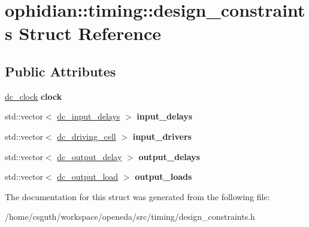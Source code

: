 \hypertarget{structophidian_1_1timing_1_1design__constraints}{\section{ophidian\-:\-:timing\-:\-:design\-\_\-constraints Struct Reference}
\label{structophidian_1_1timing_1_1design__constraints}
}
\subsection*{Public Attributes}
\begin{DoxyCompactItemize}
\item 
\hypertarget{structophidian_1_1timing_1_1design__constraints_a887bb719dde98d4635450445ca0cb7a3}{\hyperlink{structophidian_1_1timing_1_1dc__clock}{dc\-\_\-clock} {\bfseries clock}}\label{structophidian_1_1timing_1_1design__constraints_a887bb719dde98d4635450445ca0cb7a3}

\item 
\hypertarget{structophidian_1_1timing_1_1design__constraints_abdcd5469d71db560051307cad892264e}{std\-::vector$<$ \hyperlink{structophidian_1_1timing_1_1dc__input__delays}{dc\-\_\-input\-\_\-delays} $>$ {\bfseries input\-\_\-delays}}\label{structophidian_1_1timing_1_1design__constraints_abdcd5469d71db560051307cad892264e}

\item 
\hypertarget{structophidian_1_1timing_1_1design__constraints_af23b31c5745d07710d7e5e489012c674}{std\-::vector$<$ \hyperlink{structophidian_1_1timing_1_1dc__driving__cell}{dc\-\_\-driving\-\_\-cell} $>$ {\bfseries input\-\_\-drivers}}\label{structophidian_1_1timing_1_1design__constraints_af23b31c5745d07710d7e5e489012c674}

\item 
\hypertarget{structophidian_1_1timing_1_1design__constraints_a9acdb3718dc052dd259504b10d1e6722}{std\-::vector$<$ \hyperlink{structophidian_1_1timing_1_1dc__output__delay}{dc\-\_\-output\-\_\-delay} $>$ {\bfseries output\-\_\-delays}}\label{structophidian_1_1timing_1_1design__constraints_a9acdb3718dc052dd259504b10d1e6722}

\item 
\hypertarget{structophidian_1_1timing_1_1design__constraints_af0ed5233b52c421a8b863cd27b5d8528}{std\-::vector$<$ \hyperlink{structophidian_1_1timing_1_1dc__output__load}{dc\-\_\-output\-\_\-load} $>$ {\bfseries output\-\_\-loads}}\label{structophidian_1_1timing_1_1design__constraints_af0ed5233b52c421a8b863cd27b5d8528}

\end{DoxyCompactItemize}


The documentation for this struct was generated from the following file\-:\begin{DoxyCompactItemize}
\item 
/home/csguth/workspace/openeda/src/timing/design\-\_\-constraints.\-h\end{DoxyCompactItemize}
